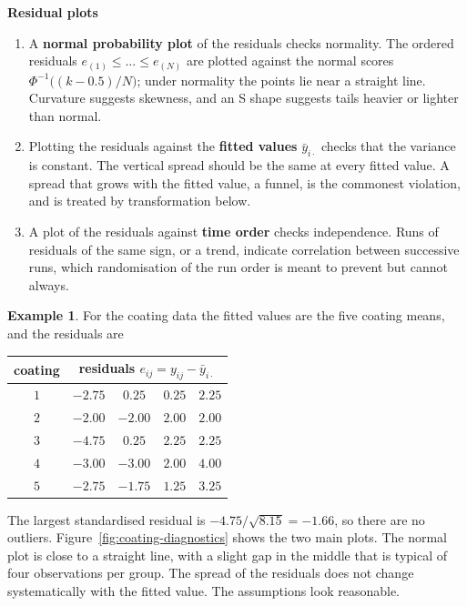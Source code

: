 \documentclass[11pt,a4paper]{article}
\numberwithin{equation}{section}
\theoremstyle{definition}
\newtheorem{exa}[thm]{Example}
\newcommand{\subhead}[1]{%
  \par\medskip\noindent\textbf{#1}\par\nobreak\smallskip}
\begin{document}
\subhead{Residual plots}
\begin{enumerate}[label=(\roman*)]
\item A \textbf{normal probability plot} of the residuals checks normality. The ordered residuals $e_{(1)} \le \dots \le e_{(N)}$ are plotted against the normal
scores $\Phi^{-1}\bigl((k - 0.5)/N\bigr)$; under normality the points lie near a straight line. Curvature suggests skewness, and an S shape suggests
tails heavier or lighter than normal.
\item Plotting the residuals against the \textbf{fitted values} $\bar y_{i\cdot}$ checks that the variance is constant. The vertical spread should be the same at
every fitted value. A spread that grows with the fitted value, a funnel, is the commonest violation, and is treated by transformation below.
\item A plot of the residuals against \textbf{time order} checks independence. Runs of residuals of the same sign, or a trend, indicate correlation
between successive runs, which randomisation of the run order is meant to prevent but cannot always.
\end{enumerate}

\begin{exa}\label{exa:coating-residuals}
For the coating data the fitted values are the five coating means, and the residuals are
\begin{center}
\begin{tabular}{c|cccc}
coating & \multicolumn{4}{c}{residuals $e_{ij} = y_{ij} - \bar y_{i\cdot}$} \\
\hline
$1$ & $-2.75$ & $0.25$ & $0.25$ & $2.25$ \\
$2$ & $-2.00$ & $-2.00$ & $2.00$ & $2.00$ \\
$3$ & $-4.75$ & $0.25$ & $2.25$ & $2.25$ \\
$4$ & $-3.00$ & $-3.00$ & $2.00$ & $4.00$ \\
$5$ & $-2.75$ & $-1.75$ & $1.25$ & $3.25$
\end{tabular}
\end{center}
The largest standardised residual is $-4.75/\sqrt{8.15} = -1.66$, so there are no outliers. Figure~\ref{fig:coating-diagnostics} shows the two main plots. The
normal plot is close to a straight line, with a slight gap in the middle that is typical of four observations per group. The spread of the residuals
does not change systematically with the fitted value. The assumptions look reasonable.
\end{exa}
\end{document}
